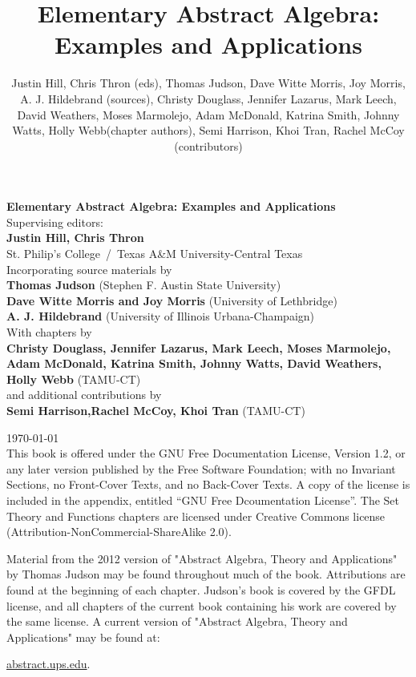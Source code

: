\documentclass[11pt]{book}
\numberwithin{equation}{section}
\begin{document}
%
\begin{titlepage}
\title{Elementary Abstract Algebra: Examples and Applications}
\author{Justin Hill, Chris Thron (eds), Thomas Judson, Dave Witte Morris, Joy Morris, A. J. Hildebrand (sources), Christy Douglass, Jennifer Lazarus,  Mark Leech,  David Weathers, Moses Marmolejo, Adam McDonald, Katrina Smith, Johnny Watts, Holly Webb(chapter authors), Semi Harrison, Khoi Tran, Rachel McCoy (contributors)}
\begin{center}
\vspace{3.5cm}
{\huge \textbf{ Elementary Abstract Algebra: Examples and Applications}}\\[1cm]
Supervising editors: \\ [0.5 cm]
{ \textbf{Justin Hill, Chris Thron } } \\
St. Philip's College~/~Texas A\&M University-Central Texas \\[0.4cm]
Incorporating source materials by\\[0.4cm]
\textbf{Thomas Judson} (Stephen F. Austin State University) \\
\textbf{Dave Witte  Morris and Joy Morris} (University of Lethbridge) \\
\textbf{A. J. Hildebrand} (University of Illinois Urbana-Champaign) \\
[0.4cm]
With chapters by\\[0.4cm]
\textbf {Christy Douglass, Jennifer Lazarus, Mark Leech, Moses Marmolejo, Adam McDonald, Katrina Smith, Johnny Watts,  David Weathers, Holly Webb} (TAMU-CT)\\
[0.4cm]
and additional contributions by\\[0.4cm]
\textbf{Semi Harrison,Rachel McCoy, Khoi Tran } (TAMU-CT)
\vfill

{\large \today}\\ [1 cm]
This book is offered under the GNU Free Documentation License, Version 1.2, or any later version published by the Free Software Foundation; with no Invariant Sections, no Front-Cover Texts, and no Back-Cover Texts. A copy of the license is included in the appendix, entitled ``GNU Free Dcoumentation License''. The  Set Theory and Functions chapters are licensed under   Creative Commons license (Attribution-NonCommercial-ShareAlike 2.0).

\end{center}
\end{titlepage}
\vspace{4cm}

\noindent
Material from the 2012 version of "Abstract Algebra, Theory and Applications" by Thomas Judson may be found throughout much of the  book.  Attributions are found at the beginning of each chapter.
Judson's book is covered by the GFDL license, and all chapters of the current book containing his work are covered by the same license. A current version of "Abstract Algebra, Theory and Applications" may be found at: 
\begin{center}
 \url{abstract.ups.edu}.
\end{center}
\end{document}
